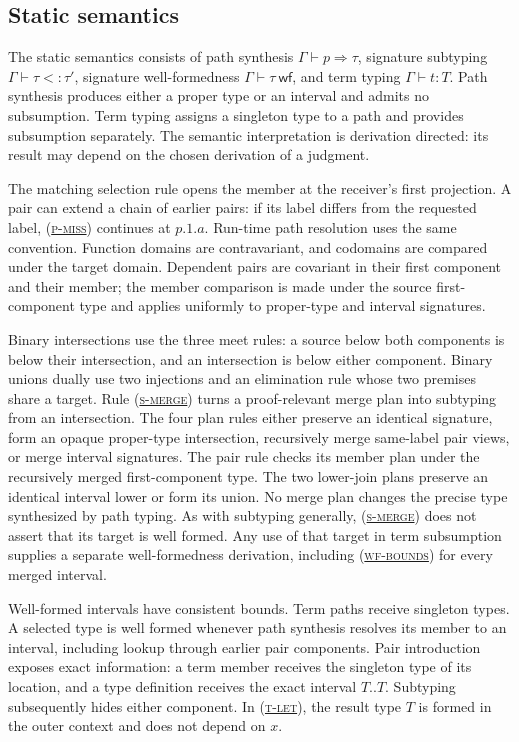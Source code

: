 \documentclass[acmsmall,screen,nonacm]{acmart}
\newcommand{\ruleref}[1]{%
  \textsc{(\hyperref[rule:#1]{#1})}}
\newcommand{\wf}{\mathrel{\mathsf{wf}}}
\begin{document}
\subsection{Static semantics}
\label{sec:static-semantics}

The static semantics consists of path synthesis
\(\Gamma\vdash p\Rightarrow\tau\), signature subtyping
\(\Gamma\vdash\tau<:\tau'\), signature well-formedness
\(\Gamma\vdash\tau\ \wf\), and term typing \(\Gamma\vdash t:T\). Path
synthesis produces either a proper type or an interval and admits no
subsumption. Term typing assigns a singleton type to a path and provides
subsumption separately. The semantic interpretation is derivation directed:
its result may depend on the chosen derivation of a judgment.

The matching selection rule opens the member at the receiver's first
projection. A pair can extend a chain of earlier pairs: if its label differs
from the requested label, \ruleref{p-miss} continues at \(p.1.a\). Run-time
path resolution uses the same convention. Function domains are contravariant,
and codomains are compared under the target domain. Dependent pairs are
covariant in their first component and their member; the member comparison
is made under the source first-component type and applies uniformly to
proper-type and interval signatures.

Binary intersections use the three meet rules: a source below both components
is below their intersection, and an intersection is below either component.
Binary unions dually use two injections and an elimination rule whose two
premises share a target.
Rule \ruleref{s-merge} turns a proof-relevant merge plan into subtyping from
an intersection. The four plan rules either preserve an identical signature,
form an opaque proper-type intersection, recursively merge same-label pair
views, or merge interval signatures. The pair rule checks its member plan
under the recursively merged first-component type. The two lower-join plans
preserve an identical interval lower or form its union. No merge plan changes
the precise type synthesized by path typing. As with subtyping generally,
\ruleref{s-merge} does not assert that its target is well formed. Any use of
that target in term subsumption supplies a separate well-formedness
derivation, including \ruleref{wf-bounds} for every merged interval.

Well-formed intervals have consistent bounds. Term paths receive singleton
types. A selected type is well formed whenever path synthesis resolves its
member to an interval, including lookup through earlier pair components.
Pair introduction exposes exact information: a term member
receives the singleton type of its location, and a type definition receives
the exact interval \(T..T\). Subtyping subsequently hides either component. In
\ruleref{t-let}, the result type \(T\) is formed in the outer context and does
not depend on \(x\).
\end{document}
